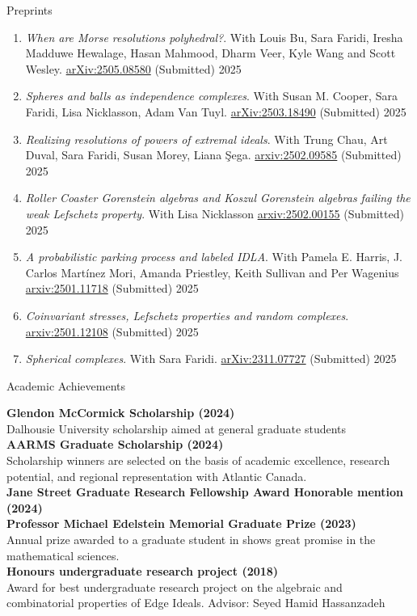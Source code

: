 \documentclass[12pt]{resume} %
\begin{document}
\begin{rSection}{Preprints}

\begin{enumerate}
    \item \textit{When are Morse resolutions polyhedral?}.  With Louis Bu, Sara Faridi, Iresha Madduwe Hewalage, Hasan Mahmood, Dharm Veer, Kyle Wang and Scott Wesley. \href{https://arxiv.org/abs/2505.08580}{arXiv:2505.08580} (Submitted) 2025 
    \item \textit{Spheres and balls as independence complexes}. With Susan M. Cooper, Sara Faridi, Lisa Nicklasson, Adam Van Tuyl. \href{https://arxiv.org/abs/2503.18490}{arXiv:2503.18490} (Submitted) 2025
    \item \textit{Realizing resolutions of powers of extremal ideals}. With Trung Chau, Art Duval, Sara Faridi, Susan Morey, Liana \c{S}ega. \href{https://arxiv.org/abs/2502.09585}{arxiv:2502.09585} (Submitted) 2025
    \item \textit{Roller Coaster Gorenstein algebras and Koszul Gorenstein algebras failing the weak Lefschetz property}. With Lisa Nicklasson  \href{https://arxiv.org/abs/2502.00155}{arxiv:2502.00155} (Submitted) 2025
    \item \textit{A probabilistic parking process and labeled IDLA}. With Pamela E. Harris, J. Carlos Martínez Mori, Amanda Priestley, Keith Sullivan and Per Wagenius  \href{https://arxiv.org/abs/2501.11718}{arxiv:2501.11718} (Submitted) 2025
    \item \textit{Coinvariant stresses, Lefschetz properties and random complexes}. \href{https://arxiv.org/abs/2501.12108}{arxiv:2501.12108} (Submitted) 2025
    \item \textit{Spherical complexes}. With Sara Faridi. \href{https://arxiv.org/abs/2311.07727}{arXiv:2311.07727} (Submitted) 2025
\end{enumerate}
\end{rSection}

\newpage

\begin{rSection}{Academic Achievements}

{\bf Glendon McCormick Scholarship (2024)}
\\
Dalhousie University scholarship aimed at general graduate students
\\[1mm]
{\bf AARMS Graduate Scholarship (2024)}
\\
Scholarship winners are selected on the basis of academic excellence, research potential, and regional representation with Atlantic Canada.
\\[1mm]
{\bf Jane Street Graduate Research Fellowship Award Honorable mention (2024)}
\\[1mm]
{\bf Professor Michael Edelstein Memorial Graduate Prize (2023)}
\\
Annual prize awarded to a graduate student in shows great promise in the mathematical sciences. 
\\[1mm]
{\bf Honours undergraduate research project (2018)}
\\
Award for best undergraduate research project on the algebraic and combinatorial properties of Edge Ideals.
Advisor: Seyed Hamid Hassanzadeh
\end{rSection}
\end{document}
